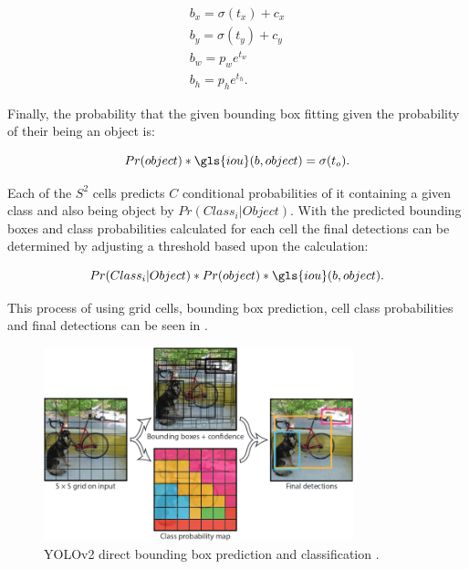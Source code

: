 \begin{equation}
\begin{split}  
  b_x = \sigma(t_x) + c_x \\
  b_y = \sigma(t_y) + c_y \\
  b_w = p_we^{t_w} \\
  b_h = p_he^{t_h}.
\end{split}
\end{equation}

Finally, the probability that the given bounding box fitting given the probability of their being an object is:

\begin{equation}  
  Pr(object) * \gls{iou}(b, object) = \sigma(t_o).  
\end{equation}

Each of the $S^2$ cells predicts $C$ conditional probabilities of it containing a given class and also being object by $Pr(Class_i \rvert Object)$. With the predicted bounding boxes and class probabilities calculated for each cell the final detections can be determined by adjusting a threshold based upon the calculation:

\begin{equation}
  Pr(Class_i \rvert Object) *  Pr(object) * \gls{iou}(b, object). 
\end{equation}

This process of using grid cells, bounding box prediction, cell class probabilities and final detections can be seen in .

\begin{figure}[H]
  \centering
    \includegraphics[width=0.8\textwidth]{Figs/Techanal/yolomodel.png}
      \caption{YOLOv2 direct bounding box prediction and classification  \cite{yolov2}.}
    \label{fig:yolomodel}
\end{figure}

